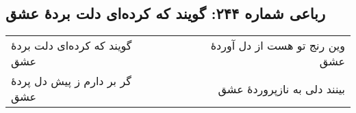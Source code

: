 \begin{center}
\section*{رباعی شماره ۲۴۴: گویند که کرده‌ای دلت بردهٔ عشق}
\label{sec:sh244}
\begin{longtable}{l p{0.5cm} r}
گویند که کرده‌ای دلت بردهٔ عشق
&&
وین رنج تو هست از دل آوردهٔ عشق
\\
گر بر دارم ز پیش دل پردهٔ عشق
&&
بینند دلی به نازپروردهٔ عشق
\\
\end{longtable}
\end{center}
